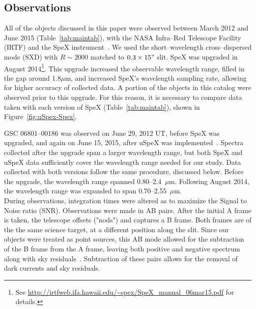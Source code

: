 \subsection{Observations}

All of the objects discussed in this paper were observed between 
March 2012 and June 2015 (Table~\ref{tab:maintab}), with the 
NASA Infra--Red Telescope Facility (IRTF) and the SpeX 
instrument~\cite{Rayner_1998}. We used the short--wavelength cross--dispersed 
mode (SXD) with $R ∼ 2000$ matched to $0.3\times15"$ slit.  SpeX was upgraded in August 2014\footnote{See \url{http://irtfweb.ifa.hawaii.edu/~spex/SpeX_manual_06mar15.pdf} for details.}. 
This upgrade increased the observable wavelength range, filled 
in the gap around 1.8$\mu$m, and increased SpeX's wavelength 
sampling rate, allowing for higher accuracy of collected data.
A portion of the objects in this catalog were observed prior to this upgrade.  
For this reason, it is necessary to compare data taken with each version of SpeX (Table~\ref{tab:maintab}), 
shown in Figure~\ref{fig:uSpex-Spex}.



GSC 06801--00186 was observed on June 29, 
2012 UT, before SpeX was upgraded, and again on June 15, 2015, after uSpeX 
was implemented~\cite{Spextool_Manual_Cushing_2015}.  Spectra collected after 
the upgrade span a larger wavelength range, but both SpeX and uSpeX data sufficiently 
cover the wavelength range needed for our study.  Data collected with both versions 
follow the same procedure, discussed below.  Before the upgrade, the wavelength 
range spanned 0.80--2.4~$\mu$m.  Following August 2014, the wavelength range 
was expanded to span 0.70--2.55~$\mu$m.\\

 



During observations, integration times were altered as to maximize the Signal to Noise ratio (SNR).  
Observations were made in AB pairs.  After the initial A frame is taken, the telescope offsets ("nods") and captures a B frame.  Both frames are of the the same science target, at a different position along the slit.  Since our objects were treated as point sources, this AB mode allowed for the subtraction of the B frame from the A frame, leaving both positive and negative spectrum along with sky residuals~\cite{Cushing_2004}. Subtraction of these pairs allows for the removal of dark currents and sky residuals.



